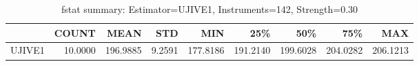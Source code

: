 \begin{table}[ht]
\centering
\caption{fstat summary: Estimator=UJIVE1, Instruments=142, Strength=0.30}
\begin{tabular}{lrrrrrrrr}
\toprule
 & COUNT & MEAN & STD & MIN & 25\% & 50\% & 75\% & MAX \\
\midrule
UJIVE1 & 10.0000 & 196.9885 & 9.2591 & 177.8186 & 191.2140 & 199.6028 & 204.0282 & 206.1213 \\
\bottomrule
\end{tabular}
\end{table}
